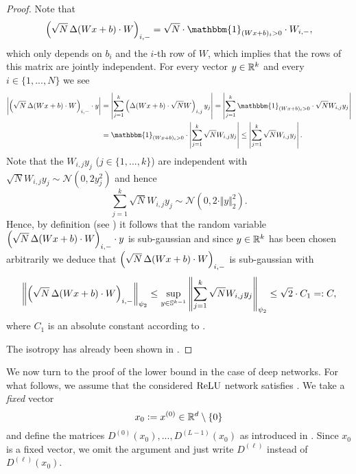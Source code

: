 \begin{proof}
    Note that
    \begin{equation*}
        \left(\sqrt{N} \diag(Wx + b) \cdot W\right)_{i,-} = \sqrt{N} \cdot \mathbbm{1}_{(Wx+b)_i > 0} \cdot W_{i,-},
    \end{equation*}
    which only depends on $b_i$ and the $i$-th row of $W$, which implies that the rows of this matrix are jointly independent. 
    For every vector $y \in \mathbb{R}^k$ and every $i \in \{1,...,N\}$ we see
    \begin{align*}
    	 \abs{\left(\sqrt{N} \diag(Wx + b) \cdot W\right)_{i,-} \cdot y } &= \abs{\sum_{j=1}^k \left(\diag(Wx + b) \cdot \sqrt{N}W\right)_{i,j}y_j} = \abs{\sum_{j=1}^k \mathbbm{1}_{(Wx + b)_i > 0} \cdot \sqrt{N}W_{i,j}y_j} \\
    	 &= \mathbbm{1}_{(Wx + b)_i > 0} \cdot \abs{\sum_{j = 1}^k \sqrt{N}W_{i,j}y_j} \leq \abs{\sum_{j = 1}^k \sqrt{N}W_{i,j}y_j} .
    \end{align*}
    Note that the $W_{i,j}y_j$ ($j \in \{1,...,k\}$) are independent with $\sqrt{N}W_{i,j}y_j \sim \mathcal{N}(0, 2 y_j^2)$ and hence
    \begin{equation*}
    	\sum_{j = 1}^k \sqrt{N}W_{i,j}y_j \sim \mathcal{N}(0, 2 \cdot \Vert y \Vert_2^2).
    \end{equation*}
    Hence, by definition (see \cite[Section~2.5.2~and~Definition~3.4.1]{vershynin_high-dimensional_2018}) it follows that the random variable $\left(\sqrt{N} \operatorname{\Delta}(Wx + b) \cdot W\right)_{i,-} \cdot y$ is sub-gaussian and since $y \in \mathbb{R}^k$ has been chosen arbitrarily we deduce that $\left(\sqrt{N} \operatorname{\Delta}(Wx + b) \cdot W\right)_{i,-}$ is sub-gaussian with
    \begin{equation*}
    \left\Vert \left(\sqrt{N} \operatorname{\Delta}(Wx + b) \cdot W\right)_{i,-}\right\Vert_{\psi_2} \leq \underset{y \in \mathbb{S}^{k-1} }{\sup} \left\Vert \sum_{j = 1}^k \sqrt{N}W_{i,j}y_j\right\Vert_{\psi_2} \leq \sqrt{2} \cdot C_1 =: C,
    \end{equation*}
    where $C_1$ is an absolute constant according to \cite[Example 2.5.8 (i)]{vershynin_high-dimensional_2018}.
    
    The isotropy has already been shown in .
\end{proof}

We now turn to the proof of the lower bound in the case of deep networks. 
For what follows, we assume that the considered $\operatorname{ReLU}$ network satisfies . 
We take a \emph{fixed} vector 
\begin{equation*}
x_0\mathrel{\mathop:}= x^{(0)} \in \mathbb{R}^d \setminus \{0\}
\end{equation*}
 and define the matrices $D^{(0)}(x_0),..., D^{(L-1)}(x_0)$ 
as introduced in . 
Since $x_0$ is a fixed vector, we omit the argument and just write $D^{(\ell)}$ instead of $D^{(\ell)}(x_0)$. 

